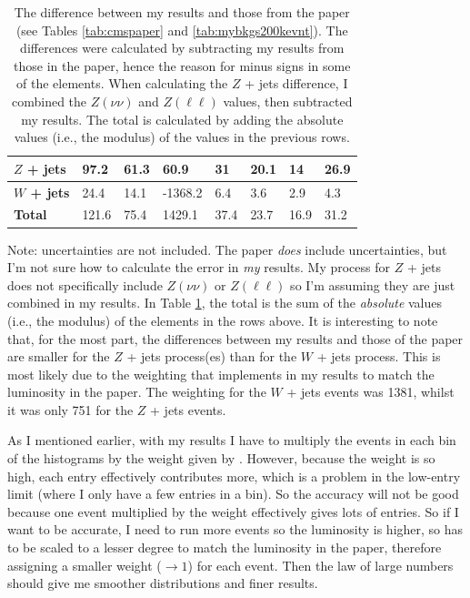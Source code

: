 \begin{table}[H]
\begin{tabular}{|l|lllllll|}
    \textbf{$Z$ + jets}  & 97.2    & 61.3    & 60.9    & 31      & 20.1     & 14        & 26.9    \\ \hline
    \textbf{$W$ + jets} & 24.4    & 14.1    & -1368.2     & 6.4     & 3.6      & 2.9       & 4.3     \\ \hline
    \textbf{Total}        & 121.6 & 75.4  & 1429.1   & 37.4  & 23.7   & 16.9    & 31.2  \\ \hline
    \end{tabular}
    \caption{The difference between my results and those from the paper (see Tables \ref{tab:cmspaper} and \ref{tab:mybkgs200kevnt}). The differences were calculated by subtracting my results from those in the paper, hence the reason for minus signs in some of the elements. When calculating the $Z$ + jets difference, I combined the $Z(\nu\nu)$ and $Z(\ell\ell)$ values, then subtracted my results. The total is calculated by adding the absolute values (i.e., the modulus) of the values in the previous rows.}
    \label{tab:diff-mine-cms}
\end{table}

Note: uncertainties are not included. The paper \emph{does} include uncertainties, but I'm not sure how to calculate the error in \emph{my} results. My \madgraph process for $Z$ + jets does not specifically include $Z(\nu\nu)$ or $Z(\ell\ell)$ so I'm assuming they are just combined in my results. In Table \ref{tab:diff-mine-cms}, the total is the sum of the \emph{absolute} values (i.e., the modulus) of the elements in the rows above. It is interesting to note that, for the most part, the differences between my results and those of the paper are smaller for the $Z$ + jets process(es) than for the $W$ + jets process. This is most likely due to the weighting that \madanalysis implements in my results to match the luminosity in the paper. The weighting for the $W$ + jets events was 1381, whilst it was only 751 for the $Z$ + jets events.

As I mentioned earlier, with my \madgraph results I have to multiply the events in each bin of the histograms by the weight given by \madanalysis. However, because the weight is so high, each entry effectively contributes more, which is a problem in the low-entry limit (where I only have a few entries in a bin). So the accuracy will not be good because one event multiplied by the weight effectively gives lots of entries. So if I want to be accurate, I need to run more events so the luminosity is higher, so has to be scaled to a lesser degree to match the luminosity in the paper, therefore assigning a smaller weight ($\rightarrow 1$) for each event. Then the law of large numbers should give me smoother distributions and finer results.

